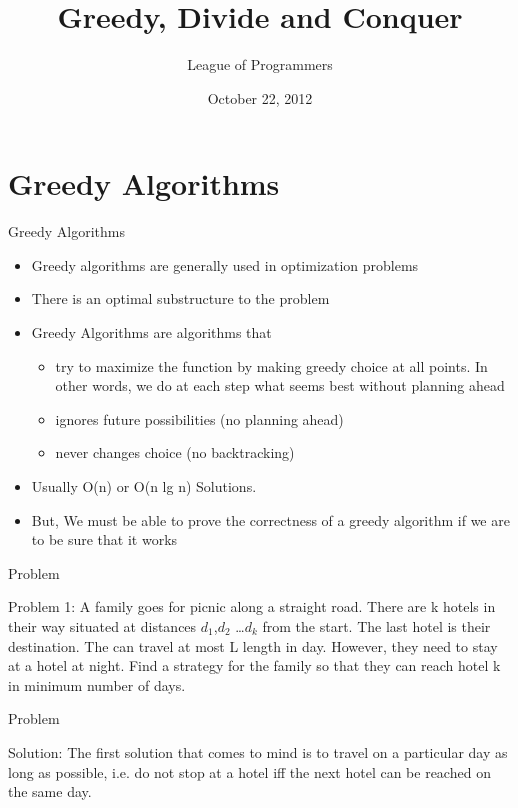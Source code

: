 \documentclass{beamer}
\title{Greedy, Divide and Conquer
}
\author{League of Programmers}
\institute{ACA, IIT Kanpur}
\date{October 22, 2012}
\begin{document}
\begin{frame}
  \titlepage
\end{frame}

\section{Greedy Algorithms}
\begin{frame}[<+->]{Greedy Algorithms}
\begin{itemize}
  \item Greedy algorithms are generally used in optimization problems
  \item There is an optimal substructure to the problem
  \item Greedy Algorithms are algorithms that
  \begin{itemize}
  \item try to maximize the function by making greedy choice at all points. In other words, we   do at each step what seems best without planning ahead
  \item ignores future possibilities (no planning ahead)
  \item never changes choice (no backtracking)
  \end{itemize}
  \item Usually O(n) or O(n lg n) Solutions.
  \item But, We must be able to prove the correctness of a greedy algorithm if we are to be sure that it works
\end{itemize}
\end{frame}

\begin{frame}{Problem}
  \begin{block}{Problem 1:}
  A family goes for picnic along a straight road. There are k hotels in their way situated at distances $d_1$,$d_2$ \ldots $d_k$ from the start. The last hotel is their destination. The can travel at most L length in day. However, they need to stay at a hotel at night. Find a strategy for the family so that they can reach hotel k in minimum number of days.
  \end{block}
\end{frame}

\begin{frame}{Problem}
  \begin{block}{Solution:}
  The first solution that comes to mind is to travel on a particular day as long as possible, i.e. do not stop at a hotel iff the next hotel can be reached on the same day.
  \end{block}
\end{frame}
\end{document}
